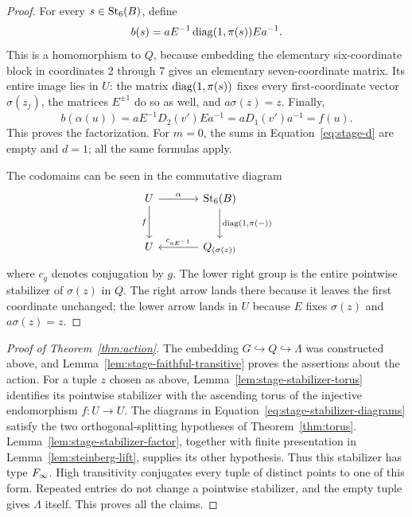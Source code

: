 \begin{proof}
For every $s\in\mathrm{St}_6(B)$, define
\begin{equation}\label{eq:stage-b}
 b(s)=aE^{-1}\operatorname{diag}(1,\pi(s))Ea^{-1}.
\end{equation}
This is a homomorphism to $Q$, because embedding the elementary
six-coordinate block in coordinates 2 through 7 gives an elementary
seven-coordinate matrix.  Its entire image lies in $U$: the
matrix $\operatorname{diag}(1,\pi(s))$ fixes every first-coordinate vector
$\sigma(z_j)$, the matrices $E^{\pm1}$ do so as well, and
$a\sigma(z)=z$.  Finally,
\[
 b(\alpha(u))
   =aE^{-1}D_2(v')Ea^{-1}
   =aD_1(v')a^{-1}
   =f(u).
\]
This proves the factorization.  For $m=0$, the sums in
Equation~\eqref{eq:stage-d} are empty and $d=1$; all the same
formulas apply.

The codomains can be seen in the commutative diagram
\[
\begin{tikzcd}[column sep=large,row sep=large]
 U \arrow[r,"\alpha"] \arrow[d,"f"']
   & \St_6(B) \arrow[d,"{\diag(1,\pi(-))}"] \\
 U
   & Q_{(\sigma(z))} \arrow[l,"c_{aE^{-1}}"']
\end{tikzcd}
\]
where $c_g$ denotes conjugation by $g$. The lower right group is
the entire pointwise stabilizer of $\sigma(z)$ in $Q$.
The right arrow lands there because it leaves the first coordinate
unchanged; the lower arrow lands in $U$ because $E$ fixes
$\sigma(z)$ and $a\sigma(z)=z$.
\end{proof}

\begin{proof}[Proof of Theorem~\ref{thm:action}]
The embedding $G\hookrightarrow Q\hookrightarrow\Lambda$ was
constructed above, and
Lemma~\ref{lem:stage-faithful-transitive} proves the assertions
about the action.  For a tuple $z$ chosen as above,
Lemma~\ref{lem:stage-stabilizer-torus} identifies its pointwise
stabilizer with the ascending torus of the injective endomorphism
$f:U\to U$.  The diagrams in
Equation~\eqref{eq:stage-stabilizer-diagrams} satisfy the two
orthogonal-splitting hypotheses of Theorem~\ref{thm:torus}.
Lemma~\ref{lem:stage-stabilizer-factor}, together with finite
presentation in Lemma~\ref{lem:steinberg-lift}, supplies its other
hypothesis.  Thus this stabilizer has type $F_\infty$.
High transitivity conjugates every tuple of distinct points to one
of this form.  Repeated entries do not change a pointwise
stabilizer, and the empty tuple gives $\Lambda$ itself.  This
proves all the claims.
\end{proof}
